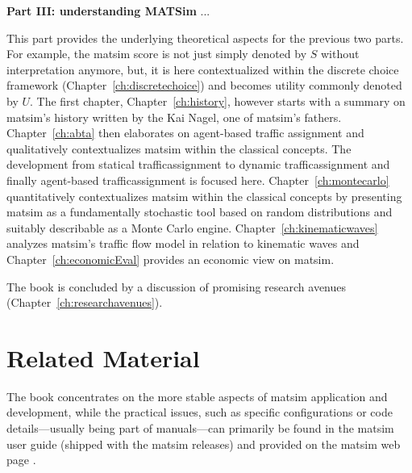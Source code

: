 \textbf{Part III: understanding MATSim} ... \\


This part provides the underlying theoretical aspects for the previous two parts. For example, the \gls{matsim} \gls{score} is not just simply denoted by $S$ without interpretation anymore, but, it is here contextualized within the discrete choice framework (Chapter~\ref{ch:discretechoice}) and becomes \gls{utility} commonly denoted by $U$. 
The first chapter, Chapter~\ref{ch:history}, however starts with a summary on \gls{matsim}'s history written by the Kai Nagel, one of \gls{matsim}'s fathers. 
Chapter~\ref{ch:abta} then elaborates on agent-based traffic assignment and qualitatively contextualizes \gls{matsim} within the classical concepts. The development from statical \gls{trafficassignment} to dynamic \gls{trafficassignment} and finally agent-based \gls{trafficassignment} is focused here.  
Chapter~\ref{ch:montecarlo} quantitatively contextualizes \gls{matsim} within the classical concepts by presenting \gls{matsim} as a fundamentally stochastic tool based on random distributions and suitably describable as a Monte Carlo engine.
Chapter~\ref{ch:kinematicwaves} analyzes \gls{matsim}'s traffic flow model in relation to kinematic waves and Chapter~\ref{ch:economicEval} provides an economic view on \gls{matsim}. 

The book is concluded by a discussion of promising research avenues (Chapter~\ref{ch:researchavenues}).

\section*{Related Material}
The book concentrates on the more stable aspects of \gls{matsim} application and development, while the practical issues, such as specific configurations or code details---usually being part of manuals---can primarily be found in the \gls{matsim} user guide (shipped with the \gls{matsim} releases) and provided on the \gls{matsim} web page \citep[][]{MATSim_Userguide_2015}.

